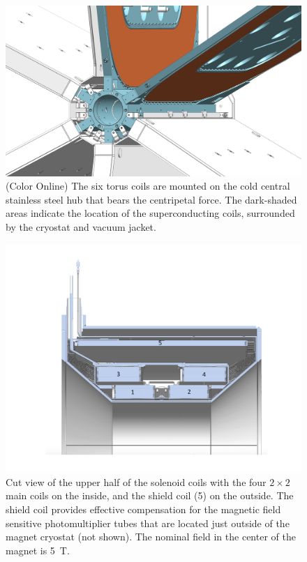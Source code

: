 \documentclass[final,3p,twocolumn]{elsarticle}
\begin{document}
\begin{figure}[th!]
\centerline{\includegraphics[width=1.00\columnwidth]{torus-hub-2.png}}
\caption{(Color Online) The six torus coils are mounted on the cold central stainless steel hub that bears the centripetal force. The
dark-shaded areas indicate the location of the superconducting coils, surrounded by the cryostat and vacuum jacket.}
\label{coil-mount}
\end{figure}


\begin{figure}[th!]
\centerline{\includegraphics[width=1.0\columnwidth]{Solenoid.pdf}}
\caption{Cut view of the upper half of the solenoid coils with the four $2 \times 2$ main coils on the inside, and the
  shield coil (5) on the outside. The shield coil provides effective compensation for the magnetic field sensitive
  photomultiplier tubes that are located just outside of the magnet cryostat (not shown). The nominal field in the
  center of the magnet is 5~T.}
\label{solenoid-coils}
\end{figure}
\end{document}
